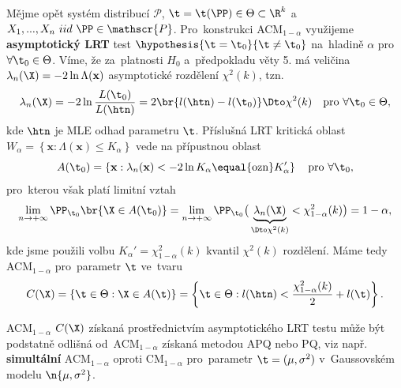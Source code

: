 \begin{example}[II]
	Mějme opět systém distribucí $\mathscr{P}$, $\t=\t(\PP)\in\Theta\subset\R^k$ a~$X_1,...,X_n~iid~\PP\in\mathscr{P}$. Pro~konstrukci ACM$_{1-\alpha}$ využijeme \textbf{asymptotický LRT} test $\hypothesis{\t=\t_0}{\t\neq\t_0}$ na~hladině $\alpha$ pro $\forall\t_0\in\Theta$. Víme, že za~platnosti $H_0$ a~předpokladu věty 5. má veličina $\lambda_n(\X)=-2\ln\Lambda(\textbf{x})$ asymptotické rozdělení $\chi^2(k)$, tzn. 
	$$ \lambda_n(\X)=-2\ln\frac{L(\t_0)}{L(\htn)}=2\br{l(\htn)-l(\t_0)}\Dto \chi^2(k)\quad \text{pro~}\forall\t_0\in\Theta, $$  kde $\htn$ je MLE odhad parametru $\t$. Příslušná LRT kritická oblast $W_\alpha=\left\{ \textbf{x}:\Lambda(\textbf{x})\leq K_\alpha \right\}$ vede na přípustnou oblast
	$$A(\t_0)=\left\{ \textbf{x}:\lambda_n(\textbf{x})<-2\ln K_\alpha\equal{\text{ozn}}K_\alpha' \right\}\quad \text{pro~}\forall\t_0,$$ pro~kterou však platí limitní vztah
	$$ \lim\limits_{n\to+\infty} \PP_{\t_0}\br{\X\in A(\t_0)}=\lim\limits_{n\to+\infty} \PP_{\t_0}\big( \underbrace{\lambda_n(\X)}_{\Dto\chi^2(k)}<\chi^2_{1-\alpha}(k) \big)=1-\alpha, $$
	kde jsme použili volbu $K_\alpha'=\chi^2_{1-\alpha}(k)$ kvantil $\chi^2(k)$ rozdělení. Máme tedy ACM$_{1-\alpha}$ pro~parametr $\t$ ve~tvaru 
	$$ C(\X)=\left\{ \t\in\Theta:\X\in A(\t) \right\}=\left\{ \t\in\Theta: l(\htn)<\frac{\chi^2_{1-\alpha}(k)}{2}+l(\t) \right\}. $$
	
\end{example}
\begin{remark}
	ACM$_{1-\alpha}$ $C(\X)$ získaná prostřednictvím asymptotického LRT testu může být podstatně odlišná od~ACM$_{1-\alpha}$ získaná metodou APQ nebo PQ, viz např. \textbf{simultální} ACM$_{1-\alpha}$ oproti CM$_{1-\alpha}$ pro~parametr $\t=(\mu,\sigma^2)$ v~Gaussovském modelu $\n{\mu,\sigma^2}$.
\end{remark}
